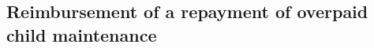 \documentclass[12pt,a4paper]{article}
\begin{document}
%
%
%
%
%
%
%


\subsection[10A. Reimbursement of a repayment of overpaid child maintenance]{Reimbursement of a repayment of overpaid child maintenance}
\end{document}
